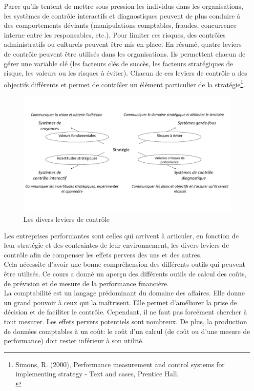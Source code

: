 \documentclass{tufte-handout}
\begin{document}
\begin{enumerate}
Parce qu'ils tentent de mettre sous pression les individus dans les organisations, les systèmes de contrôle interactifs et diagnostiques peuvent de plus conduire à des comportements déviants (manipulations comptables, fraudes, concurrence interne entre les responsables, etc.). Pour limiter ces risques, des contrôles administratifs ou culturels peuvent être mis en place. En résumé, quatre leviers de contrôle peuvent être utilisés dans les organisations. Ils permettent chacun de gérer une variable clé (les facteurs clés de succès, les facteurs stratégiques de risque, les valeurs ou les risques à éviter). Chacun de ces leviers de contrôle a des objectifs différents et permet de contrôler un élément particulier de la stratégie\footnote{Simons, R. (2000), Performance measurement and control systems for implementing strategy - Text and cases, Prentice Hall.\\}.\\

\begin{figure}[htbp]
\centering
\includegraphics[width=.9\linewidth]{./img/levers.pdf}
\caption{Les divers leviers de contrôle}
\end{figure}

Les entreprises performantes sont celles qui arrivent à articuler, en fonction de leur stratégie et des contraintes de leur environnement, les divers leviers de contrôle afin de compenser les effets pervers des uns et des autres.\\

Cela nécessite d'avoir une bonne compréhension des différents outils qui peuvent être utilisés. Ce cours a donné un aperçu des différents outils de calcul des coûts, de prévision et de mesure de la performance financière.\\

La comptabilité est un langage prédominant du domaine des affaires. Elle donne un grand pouvoir à ceux qui la maîtrisent. Elle permet d'améliorer la prise de décision et de faciliter le contrôle. Cependant, il ne faut pas forcément chercher à tout mesurer. Les effets pervers potentiels sont nombreux. De plus, la production de données comptables à un coût: le coût d’un calcul (de coût ou d'une mesure de performance) doit rester inférieur à son utilité.\\
\end{enumerate}
\end{document}
